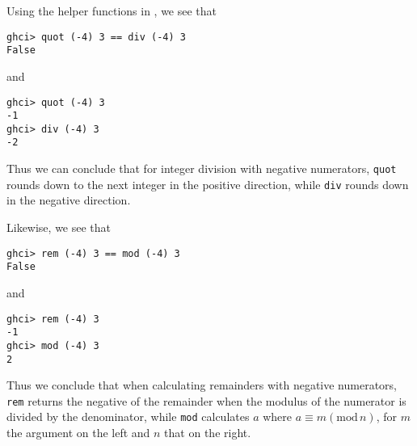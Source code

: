 
Using the helper functions in , we see that
\begin{verbatim}
ghci> quot (-4) 3 == div (-4) 3
False
\end{verbatim}
and
\begin{verbatim}
ghci> quot (-4) 3
-1
ghci> div (-4) 3
-2
\end{verbatim}
Thus we can conclude that for integer division with negative numerators, 
\verb|quot| rounds down to the next integer in the positive direction, 
while \verb|div| rounds down in the negative direction.

Likewise, we see that
\begin{verbatim}
ghci> rem (-4) 3 == mod (-4) 3
False
\end{verbatim}
and
\begin{verbatim}
ghci> rem (-4) 3
-1
ghci> mod (-4) 3
2
\end{verbatim}
Thus we conclude that when calculating remainders with negative numerators, 
\verb|rem| returns the negative of the remainder when the modulus of the numerator
is divided by the denominator, while \verb|mod| calculates $a$ where 
$a \equiv m (\text{mod}\, n)$, for $m$ the argument on the left and $n$ that on the
right.
